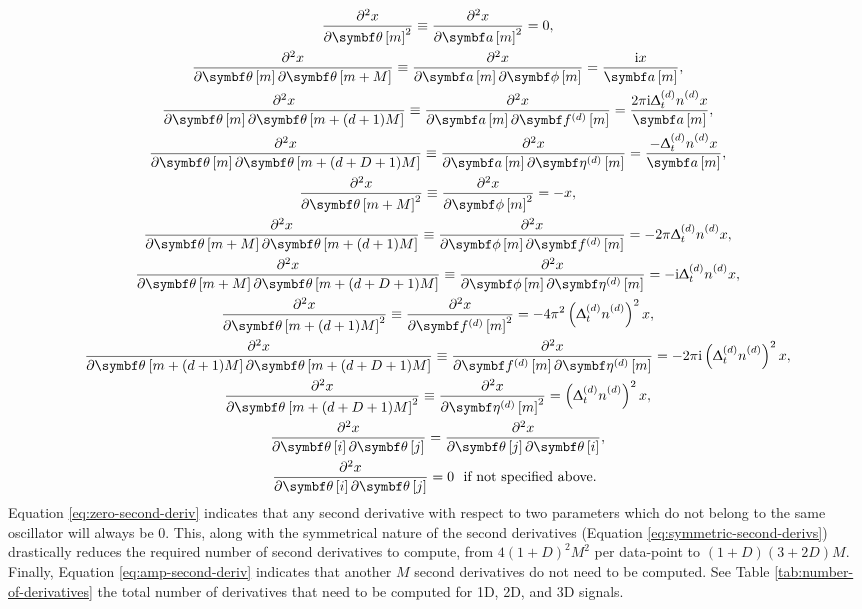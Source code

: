 \begin{subequations}
    \begin{gather}
        \xderivtwosame{\bth\left[m\right]} \equiv
            \xderivtwosame{\bdam} =
            0,
            \label{eq:amp-second-deriv}\\
        \xderivtwodiff{\bth\left[m\right]}{\bth\left[m + M\right]} \equiv
            \xderivtwodiff{\bdam}{\bdphim} =
            \frac{\iu x}{\bdam},\\
        \xderivtwodiff{\bth\left[m\right]}{\bth\left[m + (d + 1)M\right]} \equiv
            \xderivtwodiff{\bdam}{\bdfdm} =
            \frac{2 \pi \iu \Dtd \nd x}{\bdam},\\
        \xderivtwodiff{\bth\left[m\right]}{\bth\left[m + (d + D + 1)M\right]} \equiv
            \xderivtwodiff{\bdam}{\bdetadm} =
            \frac{-\Dtd \nd x}{\bdam},\\
        \xderivtwosame{\bth\left[m + M\right]} \equiv
            \xderivtwosame{\bdphim} =
            -x,\\
        \xderivtwodiff{\bth\left[m + M\right]}{\bth\left[m + (d + 1)M\right]} \equiv
            \xderivtwodiff{\bdphim}{\bdfdm} =
            -2 \pi \Dtd \nd x,\\
        \xderivtwodiff{\bth\left[m + M\right]}{\bth\left[m + (d + D + 1)M\right]} \equiv
            \xderivtwodiff{\bdphim}{\bdetadm} =
            -\iu \Dtd \nd x,\\
        \xderivtwosame{\bth\left[m + (d + 1)M\right]} \equiv
            \xderivtwosame{\bdfdm} =
            -4\pi^2 \left(\Dtd \nd \right)^2 x,\\
        \xderivtwodiff{\bth^{\vphantom{(d)}} \left[m + (d + 1)M\right]}{\bth\left[m + (d + D + 1)M\right]} \equiv
            \xderivtwodiff{\bdfdm}{\bdetadm} =
            -2 \pi \iu \left(\Dtd \nd \right)^2 x,\\
            \xderivtwosame{\bth^{\vphantom{(d)}} \left[m + (d + D + 1)M\right]} \equiv
            \xderivtwosame{\bdetadm} =
            \left(\Dtd \nd \right)^2 x,\\
        \xderivtwodiff{\bth\left[i\right]}{\bth\left[j\right]} =
            \xderivtwodiff{\bth\left[j\right]}{\bth\left[i\right]},
            \label{eq:symmetric-second-derivs}\\
        \xderivtwodiff{\bth\left[i\right]}{\bth\left[j\right]} = 0\ \text{
            if not specified above.
        }\label{eq:zero-second-deriv}
    \end{gather}
\end{subequations}
Equation \ref{eq:zero-second-deriv} indicates that any second derivative
with respect to two parameters which do not belong to the same oscillator will
always be $0$. This, along with the symmetrical nature of the second derivatives
(Equation \ref{eq:symmetric-second-derivs}) drastically reduces the required
number of second derivatives to compute, from $4 (1 + D)^2 M^2$ per data-point
to  $(1+D)\left(3 + 2D\right)M$. Finally, Equation \ref{eq:amp-second-deriv}
indicates that another $M$ second derivatives do not need to be computed. See
Table \ref{tab:number-of-derivatives} the total number of derivatives that need
to be computed for 1D, 2D, and 3D signals.

